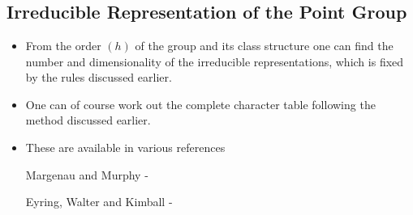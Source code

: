 \chapter{}\label{lec12}

\section*{Irreducible Representation of the Point Group}
\begin{itemize}
\item From the order $(h)$ of the group and its class structure one can find the number and dimensionality of the irreducible representations, which is fixed by the rules discussed earlier.

\item One can of course work out the complete character table following the method discussed earlier.

\item These are available in various references

Margenau and Murphy -

Eyring, Walter and Kimball -
\end{itemize}

